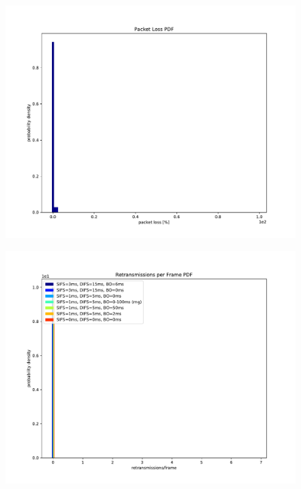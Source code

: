 \documentclass{article}
\begin{document}
	
\begin{figure}
		\includegraphics[width=\textwidth]{pdf/packet_loss_pdf}
\end{figure}

\begin{figure}
		\includegraphics[width=\textwidth]{pdf/retransmissions_per_frame_pdf}
\end{figure}
\end{document}
